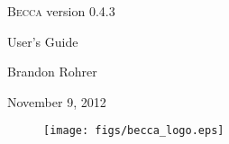 \documentclass[12pt,oneside]{book}
\begin{document}
\begin{centering}
\thispagestyle{empty}
\vspace{7cm}
{\huge \textsc{Becca} version 0.4.3 
\vspace{1cm}

User's Guide}
\vspace{4cm}

{\Large
Brandon Rohrer
\vspace{1cm}

November 9, 2012}

\vspace{4cm}

\begin{figure}[h]
\centering
\texttt{[image: figs/becca\_logo.eps]}
\end{figure}

\newpage
\end{centering}

\tableofcontents
\newpage

\addtolength{\parskip}{\baselineskip}

\setcounter{tocdepth}{0}











\appendix











%













\end{document}
